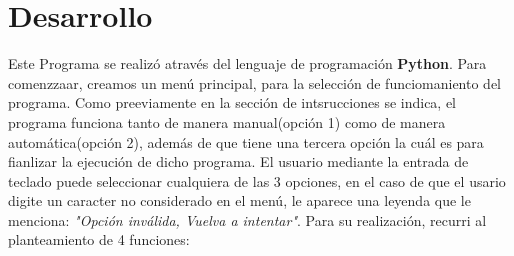 \documentclass{article}
\begin{document}
	\section*{Desarrollo}
 	Este Programa se realizó através del lenguaje de programación {\bf Python}.
 	Para comenzzaar, creamos un menú principal, para la selección de funciomaniento del programa. Como preeviamente en la sección de intsrucciones se indica, el programa funciona tanto de manera manual(opción 1) como de manera automática(opción 2), además de que tiene una tercera opción la cuál es para fianlizar la ejecución de dicho programa. 
 	El usuario mediante la entrada de teclado puede seleccionar cualquiera de las 3 opciones, en el caso de que el usario digite un caracter no considerado en el menú, le aparece una leyenda que le menciona: {\it "Opción inválida, Vuelva a intentar"}.
 	Para su realización, recurri al planteamiento de 4 funciones:
\end{document}
